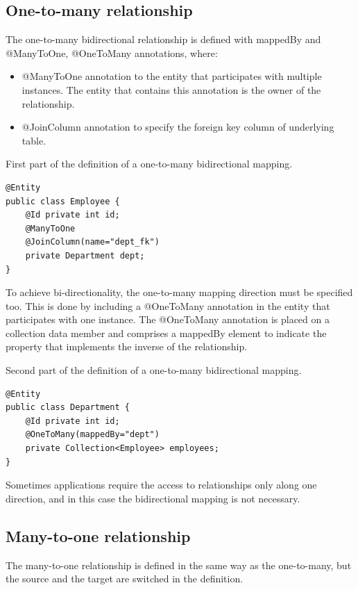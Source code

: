 \documentclass[12pt, a4paper]{report}
\begin{document}
        \subsection{One-to-many relationship}
        The one-to-many bidirectional relationship is defined with mappedBy and @ManyToOne, @OneToMany annotations, where: 
        \begin{itemize}
            \item @ManyToOne annotation to the entity that participates with multiple instances. The entity that contains this annotation is the owner of the relationship. 
            \item @JoinColumn annotation to specify the foreign key column of underlying table. 
        \end{itemize}
        \begin{example}
            First part of the definition of a one-to-many bidirectional mapping. 
            \begin{lstlisting}[style=Java]
@Entity
public class Employee {
    @Id private int id;
    @ManyToOne
    @JoinColumn(name="dept_fk")
    private Department dept;
}
            \end{lstlisting}
        \end{example}
        To achieve bi-directionality, the one-to-many mapping direction must be specified too. This is done by including a @OneToMany annotation in the entity that 
        participates with one instance. The @OneToMany annotation is placed on a collection data member and comprises a mappedBy element to indicate the property that 
        implements the inverse of the relationship.
        \begin{example}
            Second part of the definition of a one-to-many bidirectional mapping. 
            \begin{lstlisting}[style=Java]
@Entity
public class Department {
    @Id private int id;
    @OneToMany(mappedBy="dept")
    private Collection<Employee> employees;
}
            \end{lstlisting}
        \end{example}
        Sometimes applications require the access to relationships only along one direction, and in this case the bidirectional mapping is not necessary. 
        
        \subsection{Many-to-one relationship}
        The many-to-one relationship is defined in the same way as the one-to-many, but the source and the target are switched in the definition. 
\end{document}
